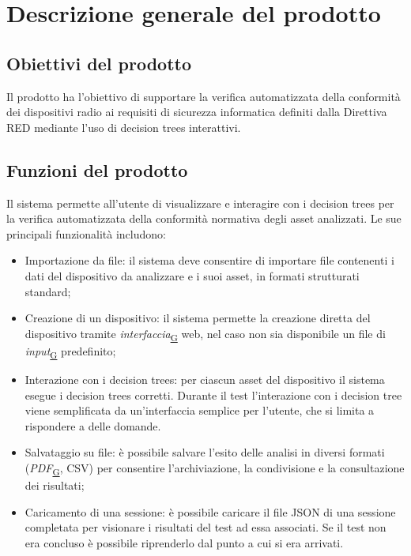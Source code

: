 \documentclass[a4paper,12pt]{article}
\begin{document}
    \newpage

    \section{Descrizione generale del prodotto}
    \subsection{Obiettivi del prodotto}
        Il prodotto ha l'obiettivo di supportare la verifica automatizzata della conformità dei dispositivi radio ai requisiti di sicurezza informatica definiti dalla Direttiva RED mediante l'uso di decision trees interattivi.
    

    \subsection{Funzioni del prodotto}
        Il sistema permette all'utente di visualizzare e interagire con i decision trees per la verifica automatizzata della conformità normativa degli asset analizzati.
        \newline
        Le sue principali funzionalità includono:
        \begin{itemize}
            \item {\ttfamily Importazione da file:} il sistema deve consentire di importare file contenenti i dati del dispositivo da analizzare e i suoi asset, in formati strutturati standard;
            \item {\ttfamily Creazione di un dispositivo:} il sistema permette la creazione diretta del dispositivo tramite \textit{interfaccia}\textsubscript{\href{https://atlasteam9.github.io/Atlas/glossario.html\#Interfaccia}{G}} web, nel caso non sia disponibile un file di \textit{input}\textsubscript{\href{https://atlasteam9.github.io/Atlas/glossario.html\#Input}{G}} predefinito;
            \item {\ttfamily Interazione con i decision trees:} per ciascun asset del dispositivo il sistema esegue i decision trees corretti. Durante il test l'interazione con i decision tree viene semplificata da un'interfaccia semplice per l'utente, che si limita a rispondere a delle domande.  
            \item {\ttfamily Salvataggio su file:} è possibile salvare l'esito delle analisi in diversi formati (\textit{PDF}\textsubscript{\href{https://atlasteam9.github.io/Atlas/glossario.html\#PDF}{G}}, CSV) per consentire l'archiviazione, la condivisione e la consultazione dei risultati;
            \item {\ttfamily Caricamento di una sessione:} è possibile caricare il file JSON di una sessione completata per visionare i risultati del test ad essa associati. Se il test non era concluso è possibile riprenderlo dal punto a cui si era arrivati.
        \end{itemize}
    
\end{document}
